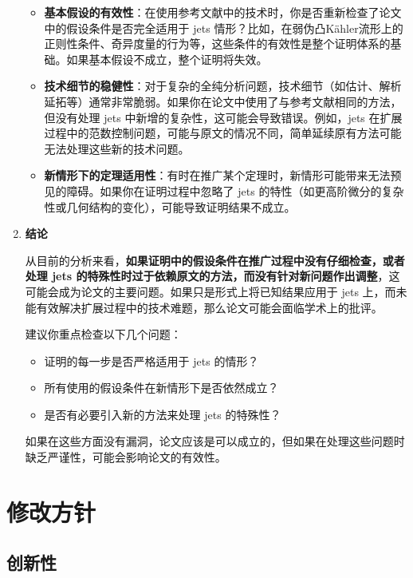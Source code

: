 \documentclass[lang=cn,zihao=-4,twoside,fontset=none]{textbook}
\begin{document}
\begin{enumerate}
    \begin{itemize}
        \item \textbf{基本假设的有效性}：在使用参考文献中的技术时，你是否重新检查了论文中的假设条件是否完全适用于 jets 情形？比如，在弱伪凸Kähler流形上的正则性条件、奇异度量的行为等，这些条件的有效性是整个证明体系的基础。如果基本假设不成立，整个证明将失效。

        \item \textbf{技术细节的稳健性}：对于复杂的全纯分析问题，技术细节（如估计、解析延拓等）通常非常脆弱。如果你在论文中使用了与参考文献相同的方法，但没有处理 jets 中新增的复杂性，这可能会导致错误。例如，jets 在扩展过程中的范数控制问题，可能与原文的情况不同，简单延续原有方法可能无法处理这些新的技术问题。

        \item \textbf{新情形下的定理适用性}：有时在推广某个定理时，新情形可能带来无法预见的障碍。如果你在证明过程中忽略了 jets 的特性（如更高阶微分的复杂性或几何结构的变化），可能导致证明结果不成立。
    \end{itemize}

    \item \textbf{结论}

    从目前的分析来看，\textbf{如果证明中的假设条件在推广过程中没有仔细检查，或者处理 jets 的特殊性时过于依赖原文的方法，而没有针对新问题作出调整}，这可能会成为论文的主要问题。如果只是形式上将已知结果应用于 jets 上，而未能有效解决扩展过程中的技术难题，那么论文可能会面临学术上的批评。

    建议你重点检查以下几个问题：
    \begin{itemize}
        \item 证明的每一步是否严格适用于 jets 的情形？
        \item 所有使用的假设条件在新情形下是否依然成立？
        \item 是否有必要引入新的方法来处理 jets 的特殊性？
    \end{itemize}

    如果在这些方面没有漏洞，论文应该是可以成立的，但如果在处理这些问题时缺乏严谨性，可能会影响论文的有效性。
\end{enumerate}
\newpage
\section{修改方针}
\subsection{创新性}
\end{document}
